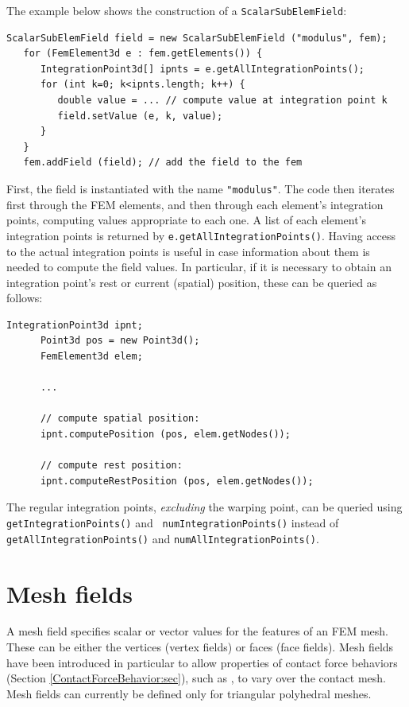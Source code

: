 The example below shows the construction of a {\tt ScalarSubElemField}:
%
\begin{lstlisting}[]
   ScalarSubElemField field = new ScalarSubElemField ("modulus", fem);
   for (FemElement3d e : fem.getElements()) {
      IntegrationPoint3d[] ipnts = e.getAllIntegrationPoints();
      for (int k=0; k<ipnts.length; k++) {
         double value = ... // compute value at integration point k
         field.setValue (e, k, value);
      }
   }
   fem.addField (field); // add the field to the fem
\end{lstlisting}
%
First, the field is instantiated with the name {\tt "modulus"}.  The
code then iterates first through the FEM elements, and then through
each element's integration points, computing values appropriate to
each one. A list of each element's integration points is returned by
{\tt e.getAllIntegrationPoints()}. Having access to the actual
integration points is useful in case information about them is needed
to compute the field values. In particular, if it is necessary to
obtain an integration point's rest or current (spatial) position,
these can be queried as follows:
%
\begin{lstlisting}[]
      IntegrationPoint3d ipnt;
      Point3d pos = new Point3d();
      FemElement3d elem;

      ...

      // compute spatial position:
      ipnt.computePosition (pos, elem.getNodes());

      // compute rest position:
      ipnt.computeRestPosition (pos, elem.getNodes());
\end{lstlisting}
%

\begin{sideblock}
The regular integration points, {\it excluding} the warping point, can
be queried using {\tt getIntegrationPoints()} and {\tt
numIntegrationPoints()} instead of {\tt getAllIntegrationPoints()}
and {\tt numAllIntegrationPoints()}.
\end{sideblock}

\section{Mesh fields}
\label{sec:meshFields}

A mesh field specifies scalar or vector values for the features of an
FEM mesh. These can be either the vertices (vertex fields) or faces
(face fields). Mesh fields have been introduced in particular to allow
properties of contact force behaviors
(Section \ref{ContactForceBehavior:sec}), such as 
,
to vary over the contact mesh. Mesh fields can currently be defined
only for triangular polyhedral meshes.

